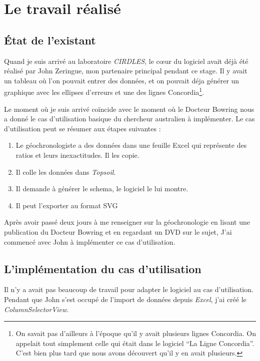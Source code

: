 ﻿\chapter{Le travail réalisé}

%
%
%
\section{État de l'existant}
Quand je suis arrivé au laboratoire \textit{CIRDLES}, le cœur du logiciel avait déjà été réalisé par John Zeringue, mon partenaire principal pendant ce stage. Il y avait un tableau où l'on pouvait entrer des données, et on pouvait déja générer un graphique avec les ellipses d'erreurs et une des lignes Concordia\footnote{On savait pas d'ailleurs à l'époque qu'il y avait plusieurs lignes Concordia. On appelait tout simplement celle qui était dans le logiciel ``La Ligne Concordia''. C'est bien plus tard que nous avons découvert qu'il y en avait plusieurs.}.

Le moment où je suis arrivé coïncide avec le moment où le Docteur Bowring nous a donné le cas d'utilisation basique du chercheur australien à implémenter. Le cas d'utilisation peut se résumer aux étapes suivantes :
\begin{enumerate}
\item Le géochronologiste a des données dans une feuille Excel qui représente des ratios et leurs inexactitudes. Il les copie.
\item Il colle les données dans \textit{Topsoil}.
\item Il demande à générer le schema, le logiciel le lui montre.
\item Il peut l'exporter au format SVG
\end{enumerate}

Après avoir passé deux jours à me renseigner sur la géochronologie en lisant une publication du Docteur Bowring et en regardant un DVD sur le sujet, %
J'ai commencé avec John à implémenter ce cas d'utilisation.

%
%
%
\section{L'implémentation du cas d'utilisation}
Il n'y a avait pas beaucoup de travail pour adapter le logiciel au cas d'utilisation. Pendant que John s'est occupé de l'import de données depuis \textit{Excel}, j'ai créé le \textit{ColumnSelectorView}.

